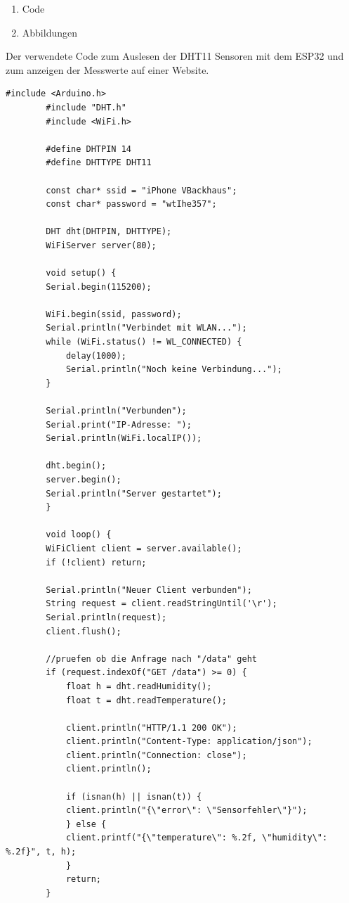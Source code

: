 
\addchap{\langanhang}

 
{\Large
\begin{enumerate}[label=\Alph*.]
	\item Code 
	\item Abbildungen

\end{enumerate}
}
\pagebreak
{}
Der verwendete Code zum Auslesen der DHT11 Sensoren mit dem ESP32 und zum anzeigen der Messwerte auf einer Website.
\lstset{language=c++}
\begin{lstlisting}[caption={Code zur Auslesung des DHT11 Sensors mit dem ESP32}, label={lst:dht11_code}]
		#include <Arduino.h>
		#include "DHT.h"
		#include <WiFi.h>

		#define DHTPIN 14
		#define DHTTYPE DHT11

		const char* ssid = "iPhone VBackhaus";
		const char* password = "wtIhe357";

		DHT dht(DHTPIN, DHTTYPE);
		WiFiServer server(80);

		void setup() {
		Serial.begin(115200);
		
		WiFi.begin(ssid, password);
		Serial.println("Verbindet mit WLAN...");
		while (WiFi.status() != WL_CONNECTED) {
			delay(1000);
			Serial.println("Noch keine Verbindung...");
		}

		Serial.println("Verbunden");
		Serial.print("IP-Adresse: ");
		Serial.println(WiFi.localIP());

		dht.begin();
		server.begin();
		Serial.println("Server gestartet");
		}

		void loop() {
		WiFiClient client = server.available();
		if (!client) return;

		Serial.println("Neuer Client verbunden");
		String request = client.readStringUntil('\r');
		Serial.println(request);
		client.flush();

		//pruefen ob die Anfrage nach "/data" geht
		if (request.indexOf("GET /data") >= 0) {
			float h = dht.readHumidity();
			float t = dht.readTemperature();

			client.println("HTTP/1.1 200 OK");
			client.println("Content-Type: application/json");
			client.println("Connection: close");
			client.println();

			if (isnan(h) || isnan(t)) {
			client.println("{\"error\": \"Sensorfehler\"}");
			} else {
			client.printf("{\"temperature\": %.2f, \"humidity\": %.2f}", t, h);
			}
			return;
		}


\end{lstlisting}
